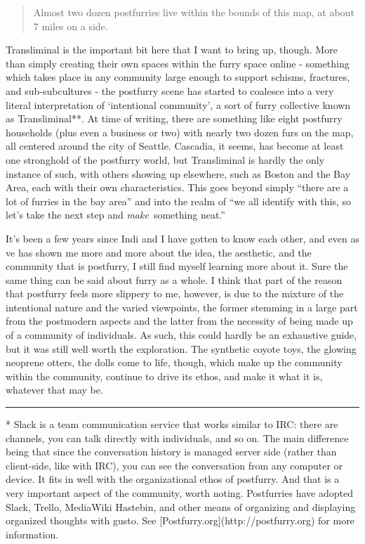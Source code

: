 \begin{quote}
Almost two dozen postfurries live within the bounds of this map, at
about 7 miles on a side.
\end{quote}

Transliminal is the important bit here that I want to bring up, though.
More than simply creating their own spaces within the furry space online
- something which takes place in any community large enough to support
schisms, fractures, and sub-subcultures - the postfurry scene has
started to coalesce into a very literal interpretation of `intentional
community', a sort of furry collective known as Transliminal**. At time
of writing, there are something like eight postfurry households (plus
even a business or two) with nearly two dozen furs on the map, all
centered around the city of Seattle. Cascadia, it seems, has become at
least one stronghold of the postfurry world, but Transliminal is hardly
the only instance of such, with others showing up elsewhere, such as
Boston and the Bay Area, each with their own characteristics. This goes
beyond simply ``there are a lot of furries in the bay area'' and into
the realm of ``we all identify with this, so let's take the next step
and \emph{make}~something neat.''

It's been a few years since Indi and I have gotten to know each other,
and even as ve has shown me more and more about the idea, the aesthetic,
and the community that is postfurry, I still find myself learning more
about it. Sure the same thing can be said about furry as a whole. I
think that part of the reason that postfurry feels more slippery to me,
however, is due to the mixture of the intentional nature and the varied
viewpoints, the former stemming in a large part from the postmodern
aspects and the latter from the necessity of being made up of a
community of individuals. As such, this could hardly be an exhaustive
guide, but it was still well worth the exploration. The synthetic coyote
toys, the glowing neoprene otters, the dolls come to life, though, which
make up the community within the community, continue to drive its ethos,
and make it what it is, whatever that may be.

\begin{center}\rule{0.5\linewidth}{\linethickness}\end{center}

* Slack is a team communication service that works similar to IRC: there
are channels, you can talk directly with individuals, and so on. The
main difference being that since the conversation history is managed
server side (rather than client-side, like with IRC), you can see the
conversation from any computer or device. It fits in well with the
organizational ethos of postfurry. And that is a very important aspect
of the community, worth noting. Postfurries have adopted Slack, Trello,
MediaWiki Hastebin, and other means of organizing and displaying
organized thoughts with gusto. See
{[}Postfurry.org{]}(http://postfurry.org) for more information.

